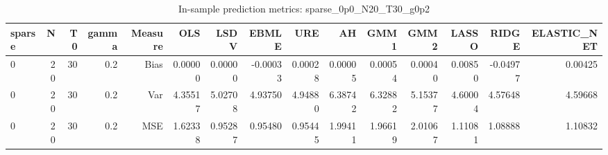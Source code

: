 \begin{table}[!htbp]\centering
\caption{In-sample prediction metrics: sparse_0p0_N20_T30_g0p2}
\label{tab:table2_sparse_0p0_N20_T30_g0p2}
\begin{tabular}{lrrrrrrrrrrrrrr}
\hline
sparse & N & T0 & gamma & Measure & OLS & LSDV & EBMLE & URE & AH & GMM1 & GMM2 & LASSO & RIDGE & ELASTIC_NET \\
\hline
0 & 20 & 30 & 0.2 & Bias & 0.00000 & 0.00000 & -0.00033 & 0.00028 & 0.00005 & 0.00054 & 0.00040 & 0.00850 & -0.04977 & 0.00425 \\
0 & 20 & 30 & 0.2 & Var & 4.35517 & 5.02708 & 4.93750 & 4.94880 & 6.38742 & 6.32882 & 5.15377 & 4.60004 & 4.57648 & 4.59668 \\
0 & 20 & 30 & 0.2 & MSE & 1.62338 & 0.95287 & 0.95480 & 0.95445 & 1.99411 & 1.96619 & 2.01067 & 1.11081 & 1.08888 & 1.10832 \\
\hline
\end{tabular}
\end{table}

